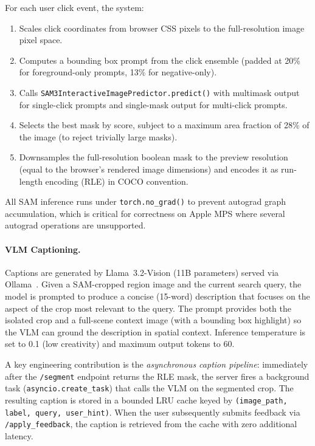 \documentclass[12pt,a4paper]{article}
\begin{document}
For each user click event, the system:
\begin{enumerate}[leftmargin=1.5em,noitemsep]
  \item Scales click coordinates from browser CSS pixels to the full-resolution
        image pixel space.
  \item Computes a bounding box prompt from the click ensemble
        (padded at 20\% for foreground-only prompts, 13\% for negative-only).
  \item Calls \texttt{SAM3InteractiveImagePredictor.predict()} with
        multimask output for single-click prompts and single-mask output
        for multi-click prompts.
  \item Selects the best mask by score, subject to a maximum area fraction
        of 28\% of the image (to reject trivially large masks).
  \item Downsamples the full-resolution boolean mask to the preview resolution
        (equal to the browser's rendered image dimensions) and encodes it as
        run-length encoding (RLE) in COCO convention.
\end{enumerate}
All SAM inference runs under \texttt{torch.no\_grad()} to prevent autograd
graph accumulation, which is critical for correctness on Apple MPS where
several autograd operations are unsupported.

\paragraph{VLM Captioning.}
Captions are generated by Llama~3.2-Vision (11B parameters) served via
Ollama~\citep{Meta2024}. Given a SAM-cropped region image and the current
search query, the model is prompted to produce a concise (15-word) description
that focuses on the aspect of the crop most relevant to the query.
The prompt provides both the isolated crop and a full-scene context image
(with a bounding box highlight) so the VLM can ground the description in
spatial context. Inference temperature is set to 0.1 (low creativity) and
maximum output tokens to 60.

A key engineering contribution is the \emph{asynchronous caption pipeline}:
immediately after the \texttt{/segment} endpoint returns the RLE mask, the
server fires a background task (\texttt{asyncio.create\_task}) that calls
the VLM on the segmented crop. The resulting caption is stored in a bounded
LRU cache keyed by \texttt{(image\_path, label, query, user\_hint)}.
When the user subsequently submits feedback via \texttt{/apply\_feedback},
the caption is retrieved from the cache with zero additional latency.
\end{document}

